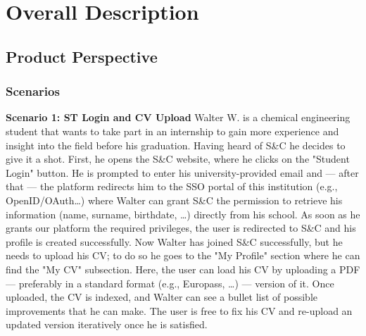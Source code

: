 \chapter{Overall Description}
\label{chap:overall_description}%

\section{Product Perspective}
\label{sec:product_perspective}%

\subsection{Scenarios}
\label{sub:scenarios}%

\par{\textbf{Scenario 1: ST Login and CV Upload}} Walter W. is a chemical engineering student that wants to take part
in an internship to gain more experience and insight into the field before his graduation. Having heard of S\&C he
decides to give it a shot. First, he opens the S\&C website, where he clicks on the "Student Login" button. He is
prompted to enter his university-provided email and — after that — the platform redirects him to the SSO portal of this
institution (e.g., OpenID/OAuth…) where Walter can grant S\&C the permission to retrieve his information
(name, surname, birthdate, …) directly from his school. As soon as he grants our platform the required privileges, the
user is redirected to S\&C and his profile is created successfully. Now Walter has joined S\&C successfully, but he needs
to upload his CV; to do so he goes to the "My Profile" section where he can find the "My CV" subsection. Here, the user
can load his CV by uploading a PDF — preferably in a standard format (e.g., Europass, …) — version of it. Once uploaded,
the CV is indexed, and Walter can see a bullet list of possible improvements that he can make. The user is free to fix
his CV and re-upload an updated version iteratively once he is satisfied.

